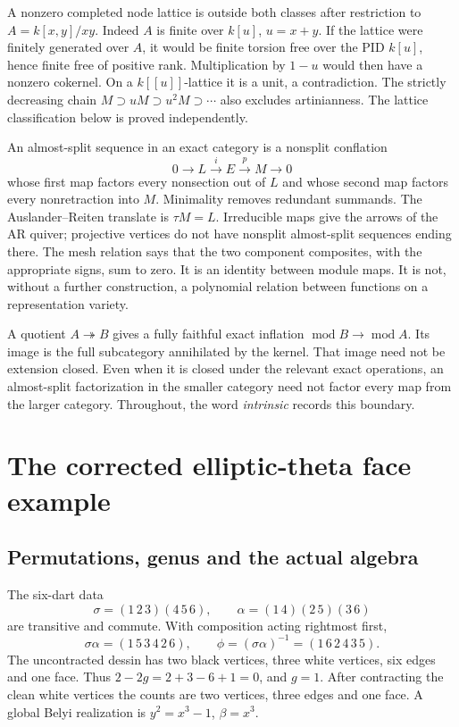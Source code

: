 A nonzero completed node lattice is outside both classes after restriction to
$A=k[x,y]/xy$. Indeed $A$ is finite over $k[u]$, $u=x+y$. If the lattice
were finitely generated over $A$, it would be finite torsion free over the PID
$k[u]$, hence finite free of positive rank. Multiplication by $1-u$ would then
have a nonzero cokernel. On a $k[[u]]$-lattice it is a unit, a contradiction.
The strictly decreasing chain $M\supset uM\supset u^2M\supset\cdots$ also
excludes artinianness. The lattice classification below is proved independently.

An almost-split sequence in an exact category is a nonsplit conflation
\[
 0\longrightarrow L\xrightarrow{i}E\xrightarrow{p}M\longrightarrow0
\]
whose first map factors every nonsection out of $L$ and whose second map factors
every nonretraction into $M$. Minimality removes redundant summands. The
Auslander--Reiten translate is $\tau M=L$. Irreducible maps give the arrows of
the AR quiver; projective vertices do not have nonsplit almost-split sequences
ending there. The mesh relation says that the two component composites, with
the appropriate signs, sum to zero. It is an identity between module maps.
It is not, without a further construction, a polynomial relation between
functions on a representation variety.

A quotient $A\twoheadrightarrow B$ gives a fully faithful exact inflation
$\operatorname{mod}B\to\operatorname{mod}A$. Its image is the full subcategory
annihilated by the kernel. That image need not be extension closed. Even when
it is closed under the relevant exact operations, an almost-split factorization
in the smaller category need not factor every map from the larger category.
Throughout, the word \emph{intrinsic} records this boundary.

\section{The corrected elliptic-theta face example}
\subsection{Permutations, genus and the actual algebra}
The six-dart data
\[
 \sigma=(1\,2\,3)(4\,5\,6),\qquad
 \alpha=(1\,4)(2\,5)(3\,6)
\]
are transitive and commute. With composition acting rightmost first,
\[
 \sigma\alpha=(1\,5\,3\,4\,2\,6),\qquad
 \phi=(\sigma\alpha)^{-1}=(1\,6\,2\,4\,3\,5).
\]
The uncontracted dessin has two black vertices, three white vertices, six edges
and one face. Thus $2-2g=2+3-6+1=0$, and $g=1$. After contracting the clean
white vertices the counts are two vertices, three edges and one face. A global
Belyi realization is $y^2=x^3-1$, $\beta=x^3$.


